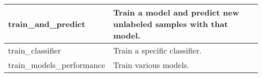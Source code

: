 \begin{scriptsize}
\begin{longtable}{|m{4.3cm}|m{11cm}|}
		\hline
		train\_and\_predict & Train a model and predict new unlabeled samples with that model. \\
		
		\hline
		train\_classifier & Train a specific classifier. \\
		
		\hline
		train\_models\_performance & Train various models. \\
		
		\hline
		
	\end{longtable}
\end{scriptsize}




%
%		
%		
%		
%		
%								
%		
%		
%						
%		
%		
